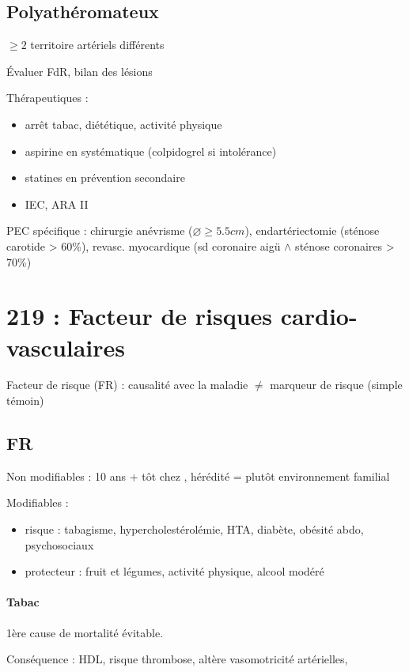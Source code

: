 \documentclass{article}
\begin{document}
\subsection{Polyathéromateux}

$\ge 2$ territoire artériels différents

Évaluer FdR, bilan des lésions

Thérapeutiques :
\begin{itemize}
  \item arrêt tabac, diététique, activité physique
  \item aspirine en systématique (colpidogrel si intolérance)
  \item statines en prévention secondaire
  \item \gls{IEC}, \gls{ARA II}
\end{itemize}

PEC spécifique : chirurgie anévrisme ($\diameter \ge 5.5cm$), endartériectomie
(sténose carotide > 60\%), revasc. myocardique (sd coronaire aigü $\wedge$
sténose coronaires > 70\%)

\section{219 : Facteur de risques cardio-vasculaires}%
\label{sec:219_facteur_de_risques_cardio_vasculaires}

Facteur de risque (FR) : causalité avec la maladie $\neq$ marqueur de risque
(simple témoin)

\subsection{FR}
Non modifiables : 10 ans + tôt chez \male, hérédité = plutôt environnement
familial

Modifiables : 
\begin{itemize}
  \item risque : {tabagisme, hypercholestérolémie, HTA, diabète, obésité abdo,
    psychosociaux}
  \item protecteur : {fruit et légumes, activité physique, alcool modéré}
\end{itemize}

\paragraph{Tabac}
1ère cause de mortalité évitable.

Conséquence : \dec HDL, \inc risque thrombose, altère vasomotricité artérielles,
\inc [CO]
\end{document}
